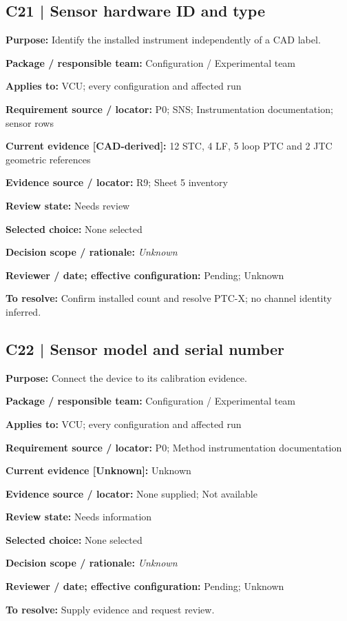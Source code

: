 \documentclass[11pt]{article}
\begin{document}
\par\noindent\begin{minipage}{\textwidth}\small\setlength{\parskip}{2pt}
\subsection*{C21 | Sensor hardware ID and type}
\textbf{Purpose:} Identify the installed instrument independently of a CAD label.\par
\textbf{Package / responsible team:} Configuration / Experimental team\par
\textbf{Applies to:} VCU; every configuration and affected run\par
\textbf{Requirement source / locator:} P0; SNS; Instrumentation documentation; sensor rows\par
\textbf{Current evidence [CAD-derived]:} 12 STC, 4 LF, 5 loop PTC and 2 JTC geometric references\par
\textbf{Evidence source / locator:} R9; Sheet 5 inventory\par
\textbf{Review state:} Needs review\par
\textbf{Selected choice:} None selected\par
\textbf{Decision scope / rationale:} \textit{Unknown}\par
\textbf{Reviewer / date; effective configuration:} Pending; Unknown\par
\textbf{To resolve:} Confirm installed count and resolve PTC-X; no channel identity inferred.\par
\end{minipage}\par\vspace{5pt}
\par\noindent\begin{minipage}{\textwidth}\small\setlength{\parskip}{2pt}
\subsection*{C22 | Sensor model and serial number}
\textbf{Purpose:} Connect the device to its calibration evidence.\par
\textbf{Package / responsible team:} Configuration / Experimental team\par
\textbf{Applies to:} VCU; every configuration and affected run\par
\textbf{Requirement source / locator:} P0; Method instrumentation documentation\par
\textbf{Current evidence [Unknown]:} Unknown\par
\textbf{Evidence source / locator:} None supplied; Not available\par
\textbf{Review state:} Needs information\par
\textbf{Selected choice:} None selected\par
\textbf{Decision scope / rationale:} \textit{Unknown}\par
\textbf{Reviewer / date; effective configuration:} Pending; Unknown\par
\textbf{To resolve:} Supply evidence and request review.\par
\end{minipage}\par\vspace{5pt}
\end{document}
